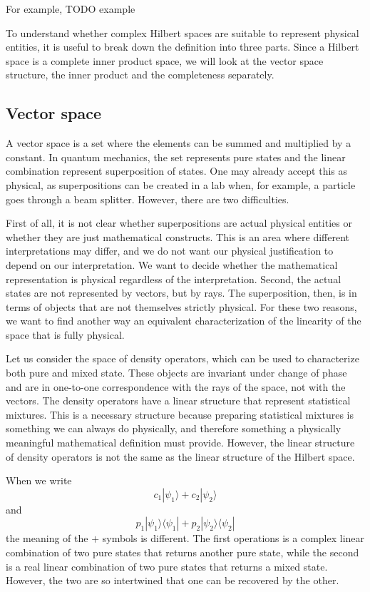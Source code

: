 \documentclass[10pt,twocolumn, nofootinbib]{revtex4-2}
\def\>{\rangle}
\def\<{\langle}
\begin{document}
For example, TODO example

To understand whether complex Hilbert spaces are suitable to represent physical entities, it is useful to break down the definition into three parts. Since a Hilbert space is a complete inner product space, we will look at the vector space structure, the inner product and the completeness separately. 

\subsection{Vector space}

A vector space is a set where the elements can be summed and multiplied by a constant. In quantum mechanics, the set represents pure states and the linear combination represent superposition of states. One may already accept this as physical, as superpositions can be created in a lab when, for example, a particle goes through a beam splitter. However, there are two difficulties.

First of all, it is not clear whether superpositions are actual physical entities or whether they are just mathematical constructs. This is an area where different interpretations may differ, and we do not want our physical justification to depend on our interpretation. We want to decide whether the mathematical representation is physical regardless of the interpretation. Second, the actual states are not represented by vectors, but by rays. The superposition, then, is in terms of objects that are not themselves strictly physical. For these two reasons, we want to find another way an equivalent characterization of the linearity of the space that is fully physical.

Let us consider the space of density operators, which can be used to characterize both pure and mixed state. These objects are invariant under change of phase and are in one-to-one correspondence with the rays of the space, not with the vectors. The density operators have a linear structure that represent statistical mixtures. This is a necessary structure because preparing statistical mixtures is something we can always do physically, and therefore something a physically meaningful mathematical definition must provide. However, the linear structure of density operators is not the same as the linear structure of the Hilbert space.

When we write
$$c_1|\psi_1\> + c_2 |\psi_2\>$$
and 
$$p_1|\psi_1\>\<\psi_1| + p_2|\psi_2\>\<\psi_2|$$
the meaning of the $+$ symbols is different. The first operations is a complex linear combination of two pure states that returns another pure state, while the second is a real linear combination of two pure states that returns a mixed state. However, the two are so intertwined that one can be recovered by the other.
\end{document}
